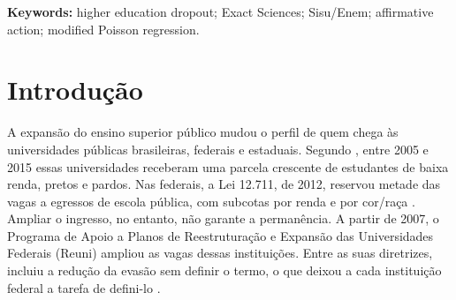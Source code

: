 \documentclass[12pt,a4paper]{article}
\begin{document}
\noindent\textbf{Keywords:} higher education dropout; Exact Sciences;
Sisu/Enem; affirmative action; modified Poisson regression.



\newpage
\tableofcontents
\newpage
\listoffigures
\newpage
\listoftables
\newpage
\clearpage
{}
\section{Introdução}
\label{sec:introducao}

A expansão do ensino superior público mudou o perfil de quem chega às universidades públicas brasileiras, federais e estaduais. Segundo \citet{costaTD2631Expansao2021}, entre 2005 e 2015 essas universidades receberam uma parcela crescente de estudantes de baixa renda, pretos e pardos. Nas federais, a Lei 12.711, de 2012, reservou metade das vagas a egressos de escola pública, com subcotas por renda e por cor/raça \citep{brasil2012lei12711}. Ampliar o ingresso, no entanto, não garante a permanência. A partir de 2007, o Programa de Apoio a Planos de Reestruturação e Expansão das Universidades Federais (Reuni) ampliou as vagas dessas instituições. Entre as suas diretrizes, incluiu a redução da evasão sem definir o termo, o que deixou a cada instituição federal a tarefa de defini-lo \citep[p.~6]{coimbraEvasaoNaEducacao2021}.
\end{document}
